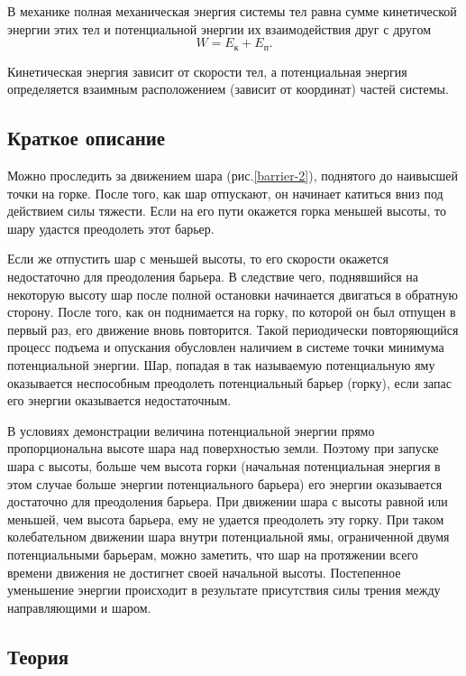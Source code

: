 \documentclass[All.tex]{subfiles}
\begin{document}
		В механике полная механическая энергия системы тел равна сумме кинетической энергии этих тел и потенциальной энергии их взаимодействия друг с другом
$$ W = E_{\text{к}} + E_{\text{п}}.$$

Кинетическая энергия зависит от скорости тел, а потенциальная энергия определяется взаимным расположением (зависит от координат) частей системы.

\subsection*{\textcolor{PineGreen}{Краткое описание}}
 
Можно проследить за движением шара (рис.\ref{barrier-2}), поднятого до наивысшей точки на горке.
После того, как шар отпускают, он начинает катиться вниз под действием силы тяжести.
Если на его пути окажется горка меньшей высоты, то шару удастся преодолеть этот барьер. 

Если же отпустить шар с меньшей высоты, то его скорости окажется недостаточно для преодоления барьера. 
В следствие чего, поднявшийся на некоторую высоту шар после полной остановки начинается двигаться в обратную сторону.
После того, как он поднимается на горку, по которой он был отпущен в первый раз, его движение вновь повторится.
Такой периодически повторяющийся процесс подъема и опускания обусловлен наличием в системе точки минимума потенциальной энергии.
Шар, попадая в так называемую потенциальную яму оказывается неспособным преодолеть потенциальный барьер (горку), если запас его энергии оказывается недостаточным.

В условиях демонстрации величина потенциальной энергии прямо пропорциональна высоте шара над поверхностью земли.
Поэтому при запуске шара с высоты, больше чем высота горки (начальная потенциальная энергия в этом случае больше энергии потенциального барьера) его энергии оказывается достаточно для преодоления барьера.
При движении шара с высоты равной или меньшей, чем высота барьера, ему не удается преодолеть эту горку.
При таком колебательном движении шара внутри потенциальной ямы, ограниченной двумя потенциальными барьерам, можно заметить, что шар на протяжении всего времени движения не достигнет своей начальной высоты.
Постепенное уменьшение энергии происходит в результате присутствия силы трения между направляющими и шаром.

\subsection*{\textcolor{PineGreen}{Теория}}
	
\end{document}
